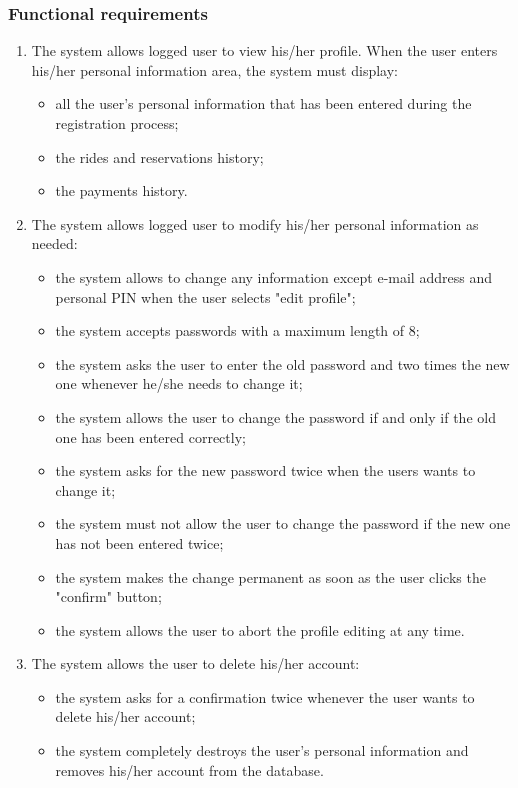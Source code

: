 \subsubsection{Functional requirements}
\begin{enumerate}
\item The system allows logged user to view his/her profile. When the user enters his/her personal information area, the system must display:
	\begin{itemize}
	\item all the user's personal information that has been entered during the registration process;
	\item the rides and reservations history;
	\item the payments history.
	\end{itemize}
\item The system allows logged user to modify his/her personal information as needed:
	\begin{itemize}
	\item the system allows to change any information except e-mail address and personal PIN when the user selects "edit profile";
	\item the system accepts passwords with a maximum length of 8;
	\item the system asks the user to enter the old password and two times the new one whenever he/she needs to change it;
	\item the system allows the user to change the password if and only if the old one has been entered correctly;
	\item the system asks for the new password twice when the users wants to change it;
	\item the system must not allow the user to change the password if the new one has not been entered twice;
	\item the system makes the change permanent as soon as the user clicks the "confirm" button;
	\item the system allows the user to abort the profile editing at any time.
	\end{itemize}
\item The system allows the user to delete his/her account:
	\begin{itemize}
	\item the system asks for a confirmation twice whenever the user wants to delete his/her account;
	\item the system completely destroys the user's personal information and removes his/her account from the database.
	\end{itemize}
\end{enumerate}

